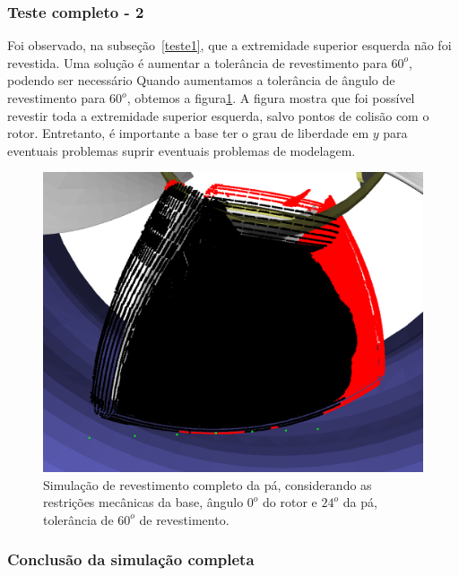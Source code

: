 \subsubsection{Teste completo - 2}

Foi observado, na subseção~\ref{teste1}, que a extremidade superior esquerda não
foi revestida. Uma solução é aumentar a tolerância de revestimento para $60^o$,
podendo ser necessário Quando aumentamos a tolerância de ângulo de revestimento para $60^o$, obtemos a figura\ref{fig::simcomp1_3}. A figura mostra que foi possível revestir toda a
extremidade superior esquerda, salvo pontos de colisão com o rotor. Entretanto,
é importante a base ter o grau de liberdade em $y$ para eventuais problemas
suprir eventuais problemas de modelagem.

\begin{figure}[!ht]
	\centering	
	\includegraphics[width=.5\columnwidth]{figs/simcomp1_3.png}
	\caption{Simulação de revestimento completo da pá, considerando as
	restrições mecânicas da base, ângulo $0^o$ do rotor e $24^o$ da pá,
	tolerância de $60^o$ de revestimento.}
	\label{fig::simcomp1_3}
\end{figure}

\subsubsection{Conclusão da simulação completa}